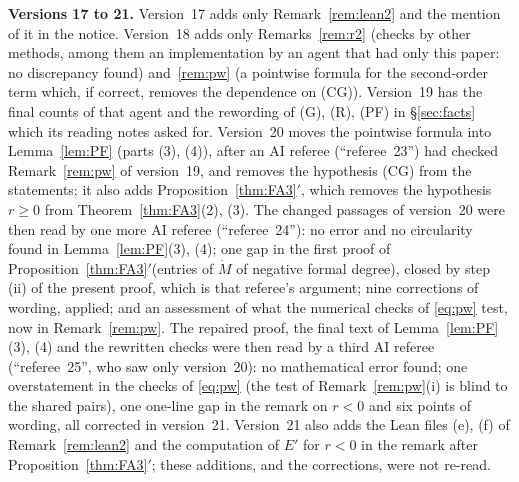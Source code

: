\documentclass[11pt]{article}
\numberwithin{equation}{section}
\newcommand{\allr}{\ref{thm:FA3}$'$}
\theoremstyle{remark}
\begin{document}
{\small\noindent\textbf{Versions 17 to 21.} Version~17 adds only Remark~\ref{rem:lean2} and the mention of it in the notice. Version~18 adds only
Remarks~\ref{rem:r2} (checks by other methods, among them an implementation by an agent that had only this
paper: no discrepancy found) and~\ref{rem:pw} (a pointwise formula for the second-order term which, if correct,
removes the dependence on (CG)).
Version~19 has the final counts of that agent and the rewording of (G), (R), (PF) in \S\ref{sec:facts} which its
reading notes asked for. Version~20 moves the pointwise formula into Lemma~\ref{lem:PF} (parts (3), (4)), after an AI referee
(``referee~23'') had checked Remark~\ref{rem:pw} of version~19, and removes the hypothesis (CG) from the statements;
it also adds Proposition~\allr, which removes the hypothesis $r\ge0$ from Theorem~\ref{thm:FA3}(2), (3).
The changed passages of version~20 were then read by one more AI referee (``referee~24''): no error and no circularity found in Lemma~\ref{lem:PF}(3), (4); one gap in the first proof of
Proposition~\allr (entries of $\dot M$ of negative formal degree), closed by step (ii) of the present proof,
which is that referee's argument; nine corrections of wording, applied; and an assessment of what the numerical
checks of \eqref{eq:pw} test, now in Remark~\ref{rem:pw}. The repaired proof, the final text of Lemma~\ref{lem:PF}(3), (4) and the rewritten checks were then read by a
third AI referee (``referee~25'', who saw only version~20): no mathematical error found; one overstatement in the
checks of \eqref{eq:pw} (the test of Remark~\ref{rem:pw}(i) is blind to the shared pairs), one one-line gap in the
remark on $r<0$ and six points of wording, all corrected in version~21. Version~21 also adds the Lean files (e),
(f) of Remark~\ref{rem:lean2} and the computation of $E'$ for $r<0$ in the remark after Proposition~\allr; these
additions, and the corrections, were not re-read.\par}
\medskip
\end{document}
